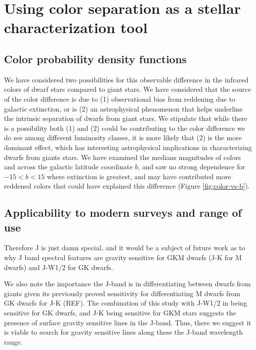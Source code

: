 \chapter{Using color separation as a stellar characterization tool}\label{chap:DISCUSSION}
\section{Color probability density functions}
We have considered two possibilities for this observable difference in the infrared colors of dwarf stars compared to giant stars. We have considered that the source of the color difference is due to (1) observational bias from reddening due to galactic extinction, or is (2) an astrophysical phenomenon that helps underline the intrinsic separation of dwarfs from giant stars. We stipulate that while there is a possibility both (1) and (2) could be contributing to the color difference we do see among different luminosity classes, it is more likely that (2) is the more dominant effect, which has interesting astrophysical implications in characterizing dwarfs from giants stars. We have examined the medians magnitudes of colors \jwone and \jwtwo across the galactic latitude coordinate $b$, and saw no strong dependence for $-15<b<15$ where extinction is greatest, and may have contributed more reddened colors that could have explained this difference (Figure \ref{fig:color-vs-b}).


\section{Applicability to modern surveys and range of use}


Therefore J is just damn special, and it would be a subject of future work as to why J band spectral features are gravity sensitive for GKM dwarfs (J-K for M dwarfs) and J-W1/2 for GK dwarfs.

We also note the importance the J-band is in differentiating between dwarfs from giants given its previously proved sensitivity for differentiating M dwarfs from GK dwarfs for J-K (REF). The combination of this study with J-W1/2 in being sensitive for GK dwarfs, and J-K being sensitive for GKM stars suggests the presence of surface gravity sensitive lines in the J-band. Thus, there we suggest it is viable to search for gravity sensitive lines along these the J-band wavelength range.